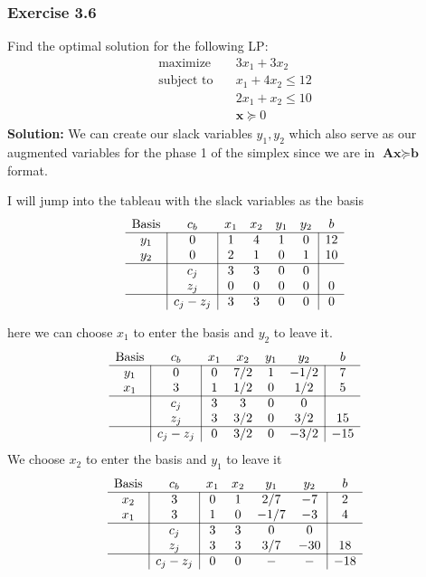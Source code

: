 \documentclass[11pt]{article}
\begin{document}
\subsubsection{Exercise 3.6}
Find the optimal solution for the following LP:
\begin{align}
  \text{maximize} & \quad 3x_1 + 3x_2 \\
  \text{subject to} & \quad x_1 + 4x_2 \leq 12 \\
  & \quad 2x_1 + x_2 \leq 10 \\
  & \quad \textbf{x} \succeq 0
\end{align}
\textbf{Solution:}
We can create our slack variables $y_1, y_2$ which also serve as our augmented variables for the phase 1 of the simplex since we are in $\textbf{A} \textbf{x} \succeq \textbf{b}$ format.

I will jump into the tableau with the slack variables as the basis
\[
\begin{array}{c|c|cccc|c}
    \text{Basis} & c_b & x_1 & x_2 & y_1 & y_2 & b \\ \hline
    y_1 & 0 & 1 & 4 & 1 & 0 & 12 \\
    y_2 & 0 & 2 & 1 & 0 & 1 & 10 \\ \hline
        & c_j & 3 & 3 & 0 & 0 \\
        & z_j & 0 & 0 & 0 & 0 & 0 \\ \hline
        & c_j - z_j & 3 & 3 & 0 & 0 & 0
\end{array}
\]

here we can choose $x_1$ to enter the basis and $y_2$ to leave it.
\[
\begin{array}{c|c|cccc|c}
    \text{Basis} & c_b & x_1 & x_2 & y_1 & y_2 & b \\ \hline
    y_1 & 0 & 0 & 7/2 & 1 & -1/2 & 7 \\
    x_1 & 3 & 1 & 1/2 & 0 & 1/2 & 5 \\ \hline
        & c_j & 3 & 3 & 0 & 0 \\
        & z_j & 3 & 3/2 & 0 & 3/2 & 15 \\ \hline
        & c_j - z_j & 0 & 3/2 & 0 & -3/2 & -15
\end{array}
\]
We choose $x_2$ to enter the basis and $y_1$ to leave it
\[
\begin{array}{c|c|cccc|c}
    \text{Basis} & c_b & x_1 & x_2 & y_1 & y_2 & b \\ \hline
    x_2 & 3 & 0 & 1 & 2/7 & -7 & 2 \\
    x_1 & 3 & 1 & 0 & -1/7 & -3 & 4  \\ \hline
        & c_j & 3 & 3 & 0 & 0 \\
        & z_j & 3 & 3 & 3/7 & -30 & 18 \\ \hline
        & c_j - z_j & 0 & 0 & - & - & -18
\end{array}
\]
\end{document}
